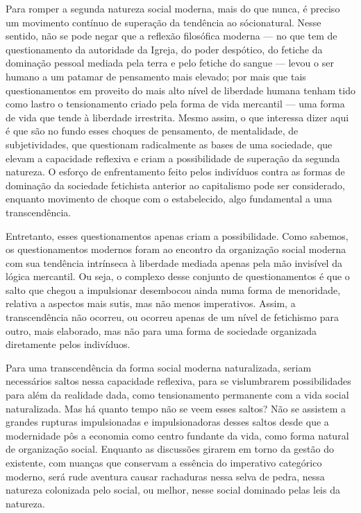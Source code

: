 Para romper a segunda natureza social moderna, mais do que nunca, é
preciso um movimento contínuo de superação da tendência ao sócionatural.
Nesse sentido, não se pode negar que a reflexão filosófica moderna --- no
que tem de questionamento da autoridade da Igreja, do poder despótico,
do fetiche da dominação pessoal mediada pela terra e pelo fetiche do
sangue --- levou o ser humano a um patamar de pensamento mais elevado;
por mais que tais questionamentos em proveito do mais alto nível de
liberdade humana tenham tido como lastro o tensionamento criado pela
forma de vida mercantil --- uma forma de vida que tende à liberdade
irrestrita. Mesmo assim, o que interessa dizer aqui é que são no fundo
esses choques de pensamento, de mentalidade, de subjetividades, que
questionam radicalmente as bases de uma sociedade, que elevam a
capacidade reflexiva e criam a possibilidade de superação da segunda
natureza. O esforço de enfrentamento feito pelos indivíduos contra as
formas de dominação da sociedade fetichista anterior ao capitalismo pode
ser considerado, enquanto movimento de choque com o estabelecido, algo
fundamental a uma transcendência.

Entretanto, esses questionamentos apenas criam a possibilidade. Como
sabemos, os questionamentos modernos foram ao encontro da organização
social moderna com sua tendência intrínseca à liberdade mediada apenas
pela mão invisível da lógica mercantil. Ou seja, o complexo desse
conjunto de questionamentos é que o salto que chegou a impulsionar
desembocou ainda numa forma de menoridade, relativa a aspectos mais
sutis, mas não menos imperativos. Assim, a transcendência não ocorreu,
ou ocorreu apenas de um nível de fetichismo para outro, mais elaborado,
mas não para uma forma de sociedade organizada diretamente pelos
indivíduos.

Para uma transcendência da forma social moderna naturalizada, seriam
necessários saltos nessa capacidade reflexiva, para se vislumbrarem
possibilidades para além da realidade dada, como tensionamento
permanente com a vida social naturalizada. Mas há quanto tempo não se
veem esses saltos? Não se assistem a grandes rupturas impulsionadas e
impulsionadoras desses saltos desde que a modernidade pôs a economia
como centro fundante da vida, como forma natural de organização social.
Enquanto as discussões girarem em torno da gestão do existente, com
nuanças que conservam a essência do imperativo categórico moderno, será
rude aventura causar rachaduras nessa selva de pedra, nessa natureza
colonizada pelo social, ou melhor, nesse social dominado pelas leis da
natureza.


